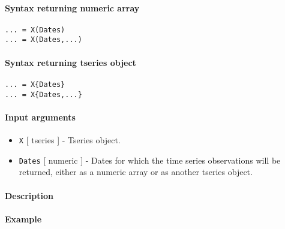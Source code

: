 


	\paragraph{Syntax returning numeric
array}

\begin{verbatim}
... = X(Dates)
... = X(Dates,...)
\end{verbatim}

\paragraph{Syntax returning tseries
object}

\begin{verbatim}
... = X{Dates}
... = X{Dates,...}
\end{verbatim}

\paragraph{Input arguments}

\begin{itemize}
\item
  \texttt{X} {[} tseries {]} - Tseries object.
\item
  \texttt{Dates} {[} numeric {]} - Dates for which the time series
  observations will be returned, either as a numeric array or as another
  tseries object.
\end{itemize}

\paragraph{Description}

\paragraph{Example}


